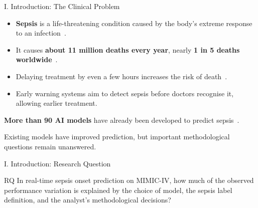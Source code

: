 \begin{frame}{I. Introduction: The Clinical Problem}
\begin{itemize}
  \item \textbf{Sepsis} is a life-threatening condition caused by the body's
        extreme response to an infection~\cite{singer2016sepsis3}.
  \item It causes \textbf{about 11 million deaths every year}, nearly
        \textbf{1 in 5 deaths worldwide}~\cite{rudd2020global}.
  \item Delaying treatment by even a few hours increases the risk of
        death~\cite{seymour2017time}.
  \item Early warning systems aim to detect sepsis before doctors recognise
        it, allowing earlier treatment.
\end{itemize}

\vspace{8pt}
\textbf{More than 90 AI models} have already been developed to predict
sepsis~\cite{wang2025srpm}.

\vfill
\begin{block}{}
  \centering Existing models have improved prediction, but important
  methodological questions remain unanswered.
\end{block}
\end{frame}


\begin{frame}{I. Introduction: Research Question}
\vfill
\begin{block}{RQ}
  In real-time sepsis onset prediction on MIMIC-IV, how much of the observed
  performance variation is explained by the choice of model, the sepsis label
  definition, and the analyst's methodological decisions?
\end{block}
\vfill
\end{frame}
